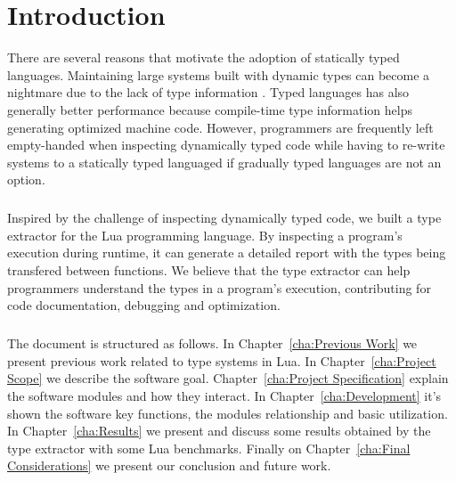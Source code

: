 
\chapter{Introduction}
There are several reasons that motivate the adoption of statically typed languages. Maintaining large systems built with dynamic types can become a nightmare due to the lack of type information \cite{takikawa_is_2016}. Typed languages has also generally better performance because compile-time type information helps generating optimized machine code. However, programmers are frequently left empty-handed when inspecting dynamically typed code while having to re-write systems to a statically typed languaged if gradually typed languages are not an option.
\paragraph*{}
Inspired by the challenge of inspecting dynamically typed code, we built a type extractor for the Lua programming language. By inspecting a program's execution during runtime, it can generate a detailed report with the types being transfered between functions. We believe that the type extractor can help programmers understand the types in a program's execution, contributing for code documentation, debugging and optimization.
\paragraph*{}
The document is structured as follows. In Chapter~\ref{cha:Previous Work} we present previous work related to type systems in Lua. In Chapter~\ref{cha:Project Scope} we describe the software goal. Chapter~\ref{cha:Project Specification} explain the software modules and how they interact. In Chapter~\ref{cha:Development} it's shown the software key functions, the modules relationship and basic utilization. In Chapter~\ref{cha:Results} we present and discuss some results obtained by the type extractor with some Lua benchmarks. Finally on Chapter~\ref{cha:Final Considerations} we present our conclusion and future work.




